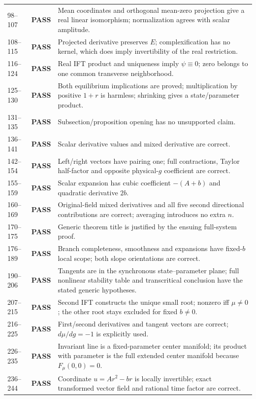 \documentclass[11pt]{article}
\newcommand{\pass}{\textbf{PASS}}
\begin{document}
\begin{longtable}{@{}p{}p{}p{}@{}}
98--107 & \pass & Mean coordinates and orthogonal mean-zero projection give a real linear isomorphism; normalization agrees with scalar amplitude.\\
108--115 & \pass & Projected derivative preserves $E$; complexification has no kernel, which does imply invertibility of the real restriction.\\
116--124 & \pass & Real IFT product and uniqueness imply $\psi\equiv0$; zero belongs to one common transverse neighborhood.\\
125--130 & \pass & Both equilibrium implications are proved; multiplication by positive $1+r$ is harmless; shrinking gives a state/parameter product.\\
131--135 & \pass & Subsection/proposition opening has no unsupported claim.\\
136--141 & \pass & Scalar derivative values and mixed derivative are correct.\\
142--154 & \pass & Left/right vectors have pairing one; full contractions, Taylor half-factor and opposite physical-$g$ coefficient are correct.\\
155--159 & \pass & Scalar expansion has cubic coefficient $-(A+b)$ and quadratic derivative $2b$.\\
160--169 & \pass & Original-field mixed derivatives and all five second directional contributions are correct; averaging introduces no extra $n$.\\
170--175 & \pass & Generic theorem title is justified by the ensuing full-system proof.\\
176--189 & \pass & Branch completeness, smoothness and expansions have fixed-$b$ local scope; both slope orientations are correct.\\
190--206 & \pass & Tangents are in the synchronous state--parameter plane; full nonlinear stability table and transcritical conclusion have the stated generic hypotheses.\\
207--215 & \pass & Second IFT constructs the unique small root; nonzero iff $\mu\ne0$; the other root stays excluded for fixed $b\ne0$.\\
216--225 & \pass & First/second derivatives and tangent vectors are correct; $d\mu/dg=-1$ is explicitly used.\\
226--235 & \pass & Invariant line is a fixed-parameter center manifold; its product with parameter is the full extended center manifold because $F_\mu(0,0)=0$.\\
236--244 & \pass & Coordinate $u=Ar^2-br$ is locally invertible; exact transformed vector field and rational time factor are correct.\\

\end{longtable}
\end{document}

